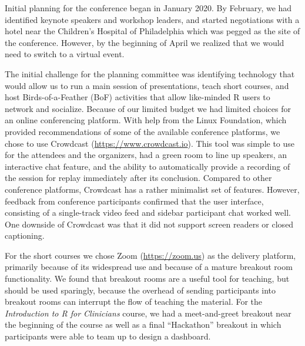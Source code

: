 Initial planning for the conference began in January 2020. By February,
we had identified keynote speakers and workshop leaders, and started
negotiations with a hotel near the Children's Hospital of Philadelphia
which was pegged as the site of the conference. However, by the
beginning of April we realized that we would need to switch to a virtual
event.

The initial challenge for the planning committee was identifying
technology that would allow us to run a main session of presentations,
teach short courses, and host Birds-of-a-Feather (BoF) activities that
allow like-minded R users to network and socialize. Because of our
limited budget we had limited choices for an online conferencing
platform. With help from the Linux Foundation, which provided
recommendations of some of the available conference platforms, we chose
to use Crowdcast (\url{https://www.crowdcast.io}). This tool was simple
to use for the attendees and the organizers, had a green room to line up
speakers, an interactive chat feature, and the ability to automatically
provide a recording of the session for replay immediately after its
conclusion. Compared to other conference platforms, Crowdcast has a
rather minimalist set of features. However, feedback from conference
participants confirmed that the user interface, consisting of a
single-track video feed and sidebar participant chat worked well. One
downside of Crowdcast was that it did not support screen readers or
closed captioning.

For the short courses we chose Zoom (\url{https://zoom.us}) as the
delivery platform, primarily because of its widespread use and because
of a mature breakout room functionality. We found that breakout rooms
are a useful tool for teaching, but should be used sparingly, because
the overhead of sending participants into breakout rooms can interrupt
the flow of teaching the material. For the \emph{Introduction to R for
Clinicians} course, we had a meet-and-greet breakout near the beginning
of the course as well as a final ``Hackathon'' breakout in which
participants were able to team up to design a dashboard.

